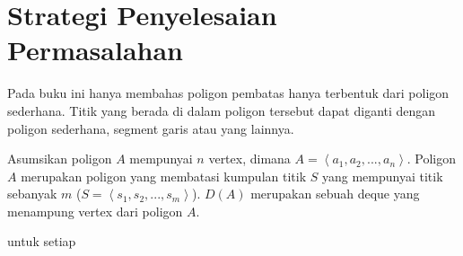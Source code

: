 \section{Strategi Penyelesaian Permasalahan}
Pada buku ini hanya membahas poligon pembatas hanya terbentuk dari poligon sederhana. Titik yang berada di dalam poligon tersebut dapat diganti dengan poligon sederhana, segment garis atau yang lainnya.
\par Asumsikan poligon $A$ mempunyai $n$ vertex, dimana $A = \left \langle a_1, a_2, ..., a_n \right \rangle$. Poligon $A$ merupakan poligon yang membatasi kumpulan titik $S$ yang mempunyai titik sebanyak $m$ ($S = \left \langle s_1, s_2, ..., s_m \right \rangle$). $D(A)$ merupakan sebuah deque yang menampung vertex dari poligon $A$.
\par untuk setiap 

